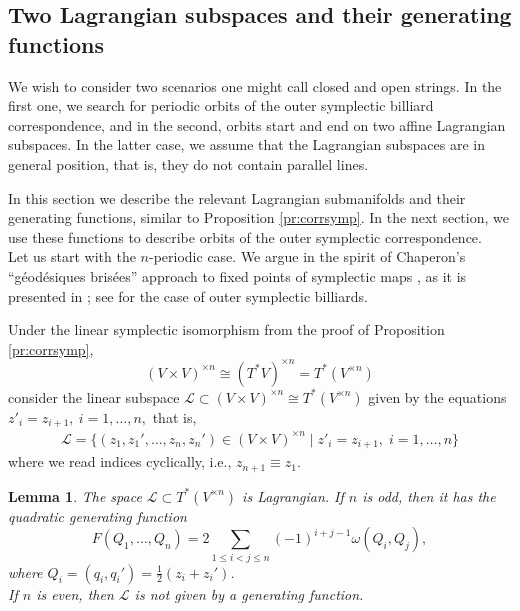 \documentclass[12pt]{article}
\newtheorem{lemma}{Lemma}[section]
\begin{document}
\subsection{Two Lagrangian subspaces and their generating functions} \label{subsect:gen}

We wish to consider two scenarios one might call closed and open strings. In the first one, we search for periodic orbits of the outer symplectic billiard correspondence, and in the second, orbits start and end on two affine Lagrangian subspaces. In the latter case, we assume that the Lagrangian subspaces are in general position, that is, they do not contain parallel lines. 

In this section we describe the relevant Lagrangian submanifolds and their generating functions, similar to Proposition \ref{pr:corrsymp}. In the next section, we use these functions to describe orbits of the outer symplectic correspondence. \\

Let us start with the $n$-periodic case. We argue in the spirit of Chaperon's ``g\' eod\' esiques bris\' ees'' approach to fixed points of symplectic maps \cite{Ch}, as it is presented in  \cite{Gi}; see \cite{FT1,Ta1} for the case of outer symplectic billiards. 

Under the linear symplectic isomorphism from the proof of Proposition \ref{pr:corrsymp}, 
$$
(V\times V)^{\times n} \cong (T^* V)^{\times n} = T^* (V^{\times n})
$$
consider the linear subspace  $\mathscr{L}\subset (V\times V)^{\times n}\cong T^* (V^{\times n})$ given by the equations
$
z'_i = z_{i+1},\ i=1,\ldots,n,
$
that is,
\begin{equation}\nonumber
\begin{aligned}
\mathscr{L}=\big\{(z_1,z_1',\ldots,z_n,z_n')\in (V\times V)^{\times n} \mid z'_i = z_{i+1},\; i=1,\ldots,n\big\}
\end{aligned}
\end{equation} 
where we read indices cyclically, i.e., $z_{n+1}\equiv z_1$. 

\begin{lemma} \label{lm:headtail}
The space ${\mathscr{L}}\subset T^* (V^{\times n})$ is Lagrangian. If $n$ is odd, then it has the quadratic generating function
\begin{equation} \label{eq:genfun}
F(Q_1,\ldots,Q_n) = 2 \sum_{1\le i < j \le n} (-1)^{i+j-1} \omega(Q_i,Q_j),
\end{equation}
where $Q_i = (q_i, q_i')=\frac{1}{2}(z_i+z_i')$.\\
If $n$ is even, then $\mathscr{L}$ is not given by a generating function.
\end{lemma} 
\end{document}
